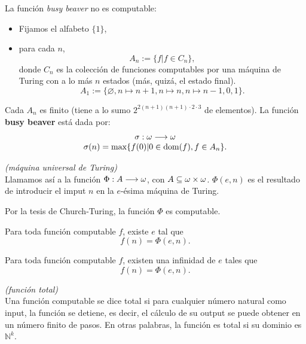 \begin{ex}
    La función \textit{busy beaver} no es computable:
    \begin{itemize}
        \item Fijamos el alfabeto $\{1\}$,
        \item para cada $n$,
            \[A_n:=\{f | f\in C_n\},\]
            donde $C_n$ es la colección de funciones computables por una máquina de Turing con a lo más $n$ estados (más, quizá, el estado final).
            \[A_1:=\{\varnothing,n\mapsto n+1,n\mapsto n,n\mapsto n-1,0,1\}.\]
    \end{itemize}
    Cada $A_n$ es finito (tiene a lo sumo $2^{2(n+1)(n+1)\cdot2\cdot3}$ de elementos). La función \textbf{busy beaver} está dada por:
    \[\begin{array}{c}
        \sigma:\omega\longrightarrow\omega\\
        \sigma(n)=\max\{f(0)|0\in\operatorname{dom}(f),f\in A_n\}.
    \end{array}\]
\end{ex}

\begin{defn} \textit{(máquina universal de Turing)}\\
    Llamamos así a la función $\Phi:A\longrightarrow\omega$, con $A\subseteq\omega\times\omega$. $\Phi(e,n)$ es el resultado de introducir el imput $n$ en la $e$-ésima máquina de Turing.   
\end{defn}

Por la tesis de Church-Turing, la función $\Phi$ es computable.

\begin{obs}
    Para toda función computable $f$, existe $e$ tal que 
    \[f(n)=\Phi(e,n).\]
\end{obs}

\begin{lem}
    Para toda función computable $f$, existen una infinidad de $e$ tales que
    \[f(n)=\Phi(e,n).\]
\end{lem}

\begin{defn} \textit{(función total)}\\
    Una función computable se dice total si para cualquier número natural como input, la función se detiene, es decir, el cálculo de su output se puede obtener en un número finito de pasos. En otras palabras, la función es total si su dominio es $\mathbb{N}^k$.
\end{defn}


